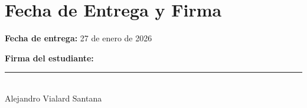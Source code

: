 \documentclass[12pt,a4paper]{article}
\begin{document}
\section{Fecha de Entrega y Firma}

\vspace{2cm}

\begin{center}
    \textbf{Fecha de entrega:} 27 de enero de 2026
\end{center}

\vspace{3cm}

\begin{center}
    \textbf{Firma del estudiante:}
\end{center}

\vspace{3cm}

\begin{center}
    \rule{8cm}{0.4pt}\\
    \vspace{0.5cm}
    Alejandro Vialard Santana
\end{center}
\end{document}
